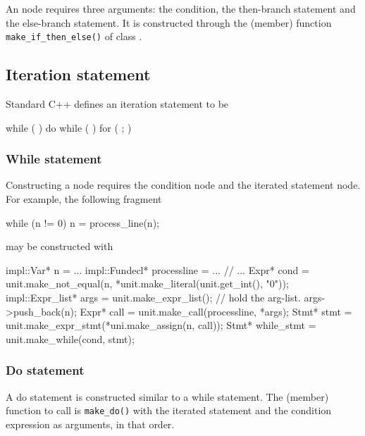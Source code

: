 \documentclass[a4paper,12pt]{article}
\begin{document}
An  node requires three arguments: the
condition, the then-branch statement and the else-branch statement.  It is
constructed through the (member) function \texttt{make\_if\_then\_else()} of
class .

\subsection{Iteration statement}
\label{sec:stmt.iteration}

Standard C++ defines an iteration statement to be 
\begin{Grammar}
      while (  ) 
      do  while (  )
      for (   ;  ) 
\end{Grammar}


\subsubsection{While statement}
\label{sec:stmt.iteration.while}

Constructing a  node requires the condition node and
the iterated statement node.  For example, the following fragment
\begin{Program}
  while (n != 0)
     n = process_line(n);
\end{Program}
may be constructed with
\begin{Program}
  impl::Var* n = ...
  impl::Fundecl* processline = ...
  // ...
  Expr* cond = unit.make_not_equal(n, *unit.make_literal(unit.get_int(), "0"));
  impl::Expr_list* args = unit.make_expr_list(); // hold the arg-list.
  args->push_back(n);  
  Expr* call = unit.make_call(processline, *args);
  Stmt* stmt = unit.make_expr_stmt(*uni.make_assign(n, call));
  Stmt* while_stmt = unit.make_while(cond, stmt);
\end{Program}


\subsubsection{Do statement}

A do statement is constructed similar to a while statement.  The
(member) function to call is \texttt{make\_do()} with the
iterated statement and the condition expression as arguments, in that order. 
\end{document}
